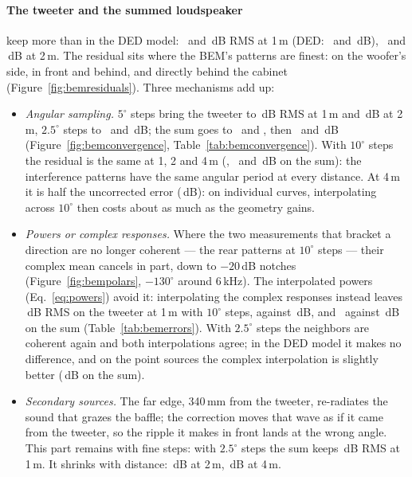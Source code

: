 \documentclass[11pt,a4paper]{article}
\begin{document}
\paragraph{The tweeter and the summed loudspeaker} keep more than in the DED model: \bemTwCorOne\ and
\bemSysCorOne\,dB RMS at 1\,m (DED: \dedTwCorOne\ and \dedSysCorOne\,dB), \bemTwCorTwo\ and
\bemSysCorTwo\,dB at 2\,m. The residual sits where the BEM's patterns are finest: on the woofer's side,
in front and behind, and directly behind the cabinet (Figure~\ref{fig:bemresiduals}). Three mechanisms
add up:
\begin{itemize}
  \item \emph{Angular sampling.} $5^\circ$ steps bring the tweeter to \bemTwFiveOne\,dB RMS at 1\,m and
  \bemTwFiveTwo\,dB at 2\,m, $2.5^\circ$ steps to \bemTwFineOne\ and \bemTwFineTwo\,dB; the sum goes to
  \bemSysFiveOne\ and \bemSysFiveTwo, then \bemSysFineOne\ and \bemSysFineTwo\,dB
  (Figure~\ref{fig:bemconvergence}, Table~\ref{tab:bemconvergence}). With $10^\circ$ steps the residual
  is the same at 1, 2 and 4\,m (\bemSysCorOne, \bemSysCorTwo\ and \bemSysCorFour\,dB on the sum): the
  interference patterns have the same angular period at every distance. At 4\,m it is half the
  uncorrected error (\bemSysRawFour\,dB): on individual curves, interpolating across $10^\circ$ then costs
  about as much as the geometry gains.
  \item \emph{Powers or complex responses.} Where the two measurements that bracket a direction are
  no longer coherent --- the rear patterns at $10^\circ$ steps --- their complex mean cancels in part,
  down to $-20$\,dB notches (Figure~\ref{fig:bempolars}, $-130^\circ$ around 6\,kHz). The interpolated
  powers (Eq.~\ref{eq:powers}) avoid it: interpolating the complex responses instead leaves
  \bemTwCpxOne\,dB RMS on the tweeter at 1\,m with $10^\circ$ steps, against \bemTwCorOne\,dB, and
  \bemSysCpxOne\ against \bemSysCorOne\,dB on the sum (Table~\ref{tab:bemerrors}). With $2.5^\circ$ steps
  the neighbors are coherent again and both interpolations agree; in the DED model it makes no
  difference, and on the point sources the complex interpolation is slightly better (\ptsSysCpxOne\,dB on
  the sum).
  \item \emph{Secondary sources.} The far edge, 340\,mm from the tweeter, re-radiates the sound that
  grazes the baffle; the correction moves that wave as if it came from the tweeter, so the ripple it
  makes in front lands at the wrong angle. This part remains with fine steps: with $2.5^\circ$ steps the
  sum keeps \bemSysFineOne\,dB RMS at 1\,m. It shrinks with distance: \bemSysFineTwo\,dB at 2\,m,
  \bemSysFineFour\,dB at 4\,m.
\end{itemize}
\end{document}
